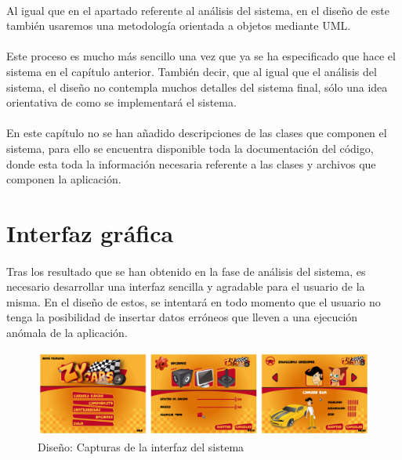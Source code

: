 

\paragraph{}
Al igual que en el apartado referente al análisis del sistema, en el diseño de este también usaremos una metodología orientada
a objetos mediante UML.

\paragraph{}
Este proceso es mucho más sencillo una vez que ya se ha especificado que hace el sistema en el capítulo anterior. También decir, que
al igual que el análisis del sistema, el diseño no contempla muchos detalles del sistema final, sólo una idea orientativa de como
se implementará el sistema.

\paragraph{}
En este capítulo no se han añadido descripciones de las clases que componen el sistema, para ello se encuentra disponible toda la
documentación del código, donde esta toda la información necesaria referente a las clases y archivos que componen la aplicación.

\section{Interfaz gráfica}

\paragraph{}
Tras los resultado que se han obtenido en la fase de análisis del sistema, es
necesario desarrollar una interfaz sencilla y agradable
para el usuario de la misma. En el diseño de estos, se intentará en todo momento que el usuario no tenga la posibilidad de insertar
datos erróneos que lleven a una ejecución anómala de la aplicación.

\begin{figure}[H]
  \label{interfaz}
  \begin{center}
    \includegraphics[scale=0.18]{imagenes/capturas/interfaz.png}
  \end{center}
  \caption{Diseño: Capturas de la interfaz del sistema}
\end{figure}

